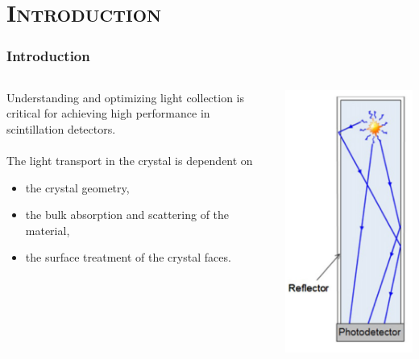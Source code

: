 \documentclass[xcolor=x11names, compress, handout]{beamer}
\renewcommand{\(}{\begin{columns}}
\renewcommand{\)}{\end{columns}}
\newcommand{\<}[1]{\begin{column}{#1}}
\renewcommand{\>}{\end{column}}
\begin{document}
\section{\scshape Introduction}
\begin{frame}
  \frametitle{Introduction}
  \begin{columns}
  \begin{column}{0.6\textwidth}
  Understanding and optimizing light collection is critical for achieving high performance in scintillation detectors. \\
  \ \\
  The light transport in the crystal is dependent on 
  \begin{itemize}
  \item the crystal geometry, 
  \item the bulk absorption and scattering of the material, 
  \item the surface treatment of the crystal faces. 
  \end{itemize}
  \ \\
  \end{column}
  \begin{column}{0.3\textwidth}
  \begin{center}
  \includegraphics[scale=0.5]{images/scintillation.png}

\end{center}
\end{column}
\end{columns}
\end{frame}
\end{document}
